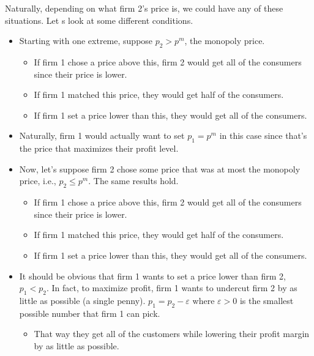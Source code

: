 \documentclass[12pt, oneside]{article}
\begin{document}
Naturally, depending on what firm 2's price is, we could have any of these situations. Let s look at some different conditions.

\begin{itemize}
    \item Starting with one extreme, suppose $p_2 > p^m$, the monopoly price.
    \begin{itemize}
        \item If firm 1 chose a price above this, firm 2 would get all of the consumers since their price is lower.
        \item If firm 1 matched this price, they would get half of the consumers.
        \item If firm 1 set a price lower than this, they would get all of the consumers.
    \end{itemize}
    \item Naturally, firm 1 would actually want to set $p_1 = p^m$ in this case since that’s the price that maximizes their profit level.
\end{itemize}

\begin{itemize}
    \item Now, let’s suppose firm 2 chose some price that was at most the monopoly price, i.e., $p_2 \leq p^m$. The same results hold.
    \begin{itemize}
        \item If firm 1 chose a price above this, firm 2 would get all of the consumers since their price is lower.
        \item If firm 1 matched this price, they would get half of the consumers.
        \item If firm 1 set a price lower than this, they would get all of the consumers.
    \end{itemize}
    \item It should be obvious that firm 1 wants to set a price lower than firm 2, $p_1 < p_2$. In fact, to maximize profit, firm 1 wants to undercut firm 2 by as little as possible (a single penny). $p_1 = p_2 - \varepsilon$ where $\varepsilon > 0$ is the smallest possible number that firm 1 can pick.
    \begin{itemize}
        \item That way they get all of the customers while lowering their profit margin by as little as possible.
    \end{itemize}
\end{itemize}
\end{document}
